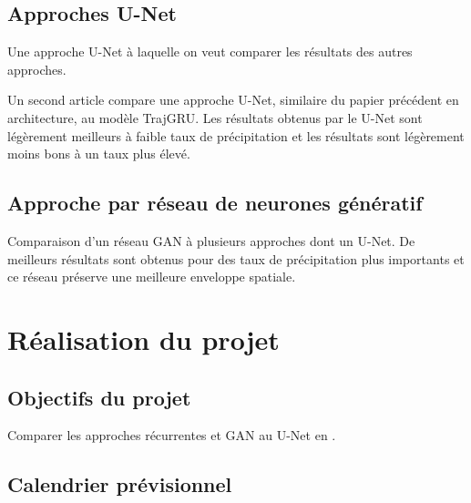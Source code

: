 \documentclass[11pt,a4paper,french]{article}
\begin{document}
\subsection{Approches U-Net}

Une approche U-Net à laquelle on veut comparer les résultats des autres approches. \cite{bouget:hal-03112093} \newline

Un second article compare une approche U-Net, similaire du papier précédent en architecture, au modèle TrajGRU. Les résultats obtenus par le U-Net sont légèrement meilleurs à faible taux de précipitation et les résultats sont légèrement moins bons à un taux plus élevé. \cite{9508500}

\subsection{Approche par réseau de neurones génératif}

Comparaison d'un réseau GAN à plusieurs approches dont un U-Net. De meilleurs résultats sont obtenus pour des taux de précipitation plus importants et ce réseau préserve une meilleure enveloppe spatiale. \cite{ravuri2021skillful}

\section{Réalisation du projet}

\subsection{Objectifs du projet}

Comparer les approches récurrentes et GAN au U-Net en \cite{bouget:hal-03112093}.

\subsection{Calendrier prévisionnel}

\newpage

\printbibliography[title=Références]
\end{document}
